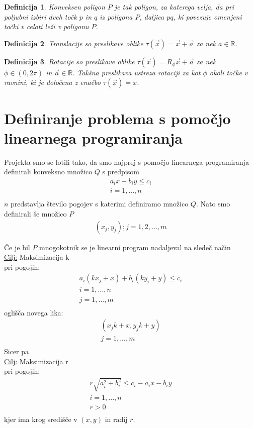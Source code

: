 \documentclass[a4paper, 12pt]{article}
\newtheorem{definicija}{Definicija}
\begin{document}
\begin{definicija}
    Konveksen poligon $P$ je tak poligon, za katerega velja, da pri poljubni izbiri dveh točk $p$ in $q$
     iz poligona $P$, daljica $pq$, ki povezuje omenjeni točki v celoti leži v poligonu $P$.
\end{definicija}

\begin{definicija}
    Translacije so preslikave oblike $\tau(\vec{x}) = \vec{x} + \vec{a}$ za nek $a \in \mathbb{R}$.
\end{definicija}

\begin{definicija}
    Rotacije so preslikave oblike $\tau (\vec{x}) = R_{\phi}\vec{x} + \vec{a}$ za nek $\phi \in (0, 2\pi)$ in $\vec{a} \in \mathbb{R}$. 
    Takšna preslikava ustreza rotaciji za kot $\phi$ okoli točke v ravnini, ki je določena z enačbo $\tau (\vec{x}) = x$. 
\end{definicija}


\section{Definiranje problema s pomočjo linearnega programiranja}
Projekta smo se lotili tako, da smo najprej s pomočjo linearnega programiranja definirali konveksno množico $Q$ s predpisom
\begin{align*}
    a_i x + b_i y \le c_i \\
    i = 1, ..., n \\
\end{align*}
$n$ predstavlja število pogojev s katerimi definiramo množico $Q$.
\newline
Nato smo definirali še množico $P$
\begin{align*}
{(x_j,y_j);j=1,2,...,m}
\end{align*}

\newpage
Če je bil $P$ mnogokotnik se je linearni program nadaljeval
 na sledeč način \\
\underline{Cilj:} Maksimizacija k \\
pri pogojih: 
\begin{align*}
    a_i (k x_j + x) + b_i(k  y_i + y) \le c_i \\
    i = 1, ..., n \\
    j = 1, ..., m \\
\end{align*}
oglišča novega lika:
\begin{align*}
(x_jk+x,y_jk+y) \\
j = 1, ..., m \\
\end{align*}
Sicer pa \\
\underline{Cilj:} Maksimizacija r \\
pri pogojih: 
\begin{align*}
    r \sqrt{a_i^2 + b_i^2} \le c_i - a_i x - b_i y \\
    i = 1, ..., n \\
    r > 0 \\
\end{align*}
kjer ima krog središče v $(x,y)$ in radij $r$.
\end{document}
